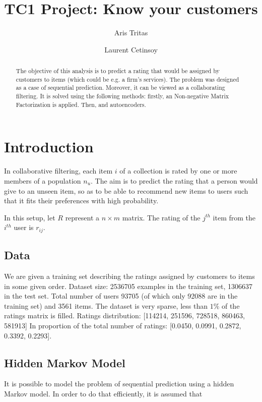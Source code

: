 \documentclass[10pt,twocolumn]{article}
\title{TC1 Project: Know your customers}
\author{Aris Tritas \and Laurent Cetinsoy}
\begin{document}
\maketitle

\begin{abstract}

The objective of this analysis is to predict a rating that would be assigned by customers to items (which could be e.g. a firm's services). 
The problem was designed as a case of sequential prediction. Moreover, it can be viewed as a collaborating filtering. It is solved using the following methods: firstly, an Non-negative Matrix Factorization is applied. Then,  and autoencoders.

\end{abstract}

\section{Introduction}

In collaborative filtering, each item $i$ of a collection is rated by one or more members of a population $n_u$. The aim is to predict the rating that a person would give to an unseen item, so as to be able to recommend new items to users such that it fits their preferences with high probability.

In this setup, let $R$ represent a $n \times m$ matrix. The rating of the $j^{th}$ item from the $i^{th}$ user is $r_{ij}$.

\subsection{Data}
We are given a training set describing the ratings assigned by customers to items in some given order.
Dataset size: 2536705 examples in the training set, 1306637 in the test set. Total number of users 93705 (of which only 92088 are in the training set) and 3561 items. The dataset is very sparse,  less than $1\% $ of the ratings matrix is filled.
Ratings distribution: [114214, 251596, 728518, 860463, 581913] In proportion of the total number of ratings: [0.0450, 0.0991, 0.2872, 0.3392, 0.2293].

\subsection{Hidden Markov Model}
It is possible to model the problem of sequential prediction using a hidden Markov model. In order to do that efficiently, it is assumed that 
\end{document}
